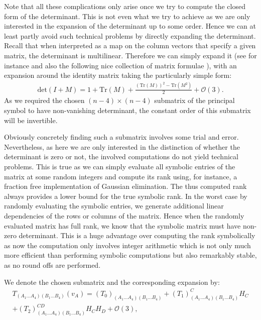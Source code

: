 Note that all these complications only arise once we try to compute the closed form of the determinant. This is not even what we try to achieve as we are only interested in the expansion of the determinant up to some order. Hence we can at least partly avoid such technical problems by directly expanding the determinant. Recall that when interpreted as a map on the column vectors that specify a given matrix, the determinant is multilinear. Therefore we can simply expand it (see for instance \cite{2008CoTPh..49..801Z} and also the following nice collection of matrix formulae \cite{IMM2012-03274}), with an expansion around the identity matrix taking the particularly simple form:
\begin{align}\label{detExp}
    \mathrm{det}(I+M) = 1 + \mathrm{Tr}(M) + \frac{(\mathrm{Tr}(M))^2- \mathrm{Tr}(M^2)}{2} + \mathcal{O}(3). 
\end{align}
As we required the chosen $(n-4)\times (n-4)$ submatrix of the principal symbol to have non-vanishing determinant, the constant order of this submatrix will be invertible.
\begin{remark}
Obviously concretely finding such a submatrix involves some trial and error. Nevertheless, as here we are only interested in the distinction of whether the determinant is zero or not, the involved computations do not yield technical problems. This is true as we can simply evaluate all symbolic entries of the matrix at some random integers and compute its rank using, for instance, a fraction free implementation of Gaussian elimination. The thus computed rank always provides a lower bound for the true symbolic rank. In the worst case by randomly evaluating the symbolic entries, we generate additional linear dependencies of the rows or columns of the matrix. Hence when the randomly evaluated matrix has full rank, we know that the symbolic matrix must have non-zero determinant. This is a huge advantage over computing the rank symbolically as now the computation only involves integer arithmetic which is not only much more efficient than performing symbolic computations but also remarkably stable, as no round offs are performed.
\end{remark}
We denote the chosen submatrix and the corresponding expansion by:
\begin{multline}
    T_{(A_1...A_4)(B_1...B_4)}(v_A) = (T_0)_{(A_1...A_4)(B_1...B_4)} + (T_1)_{(A_1...A_4)(B_1...B_4)}^{C} H_C \\
    +(T_2)_{(A_1...A_4)(B_1...B_4)}^{CD} H_C H_D + \mathcal{O}(3),
\end{multline}
